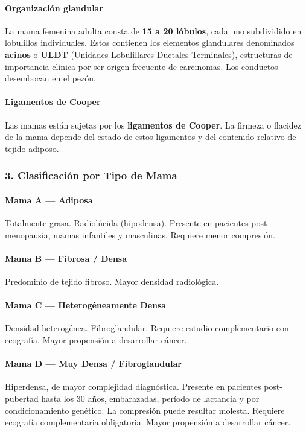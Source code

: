 	
	\paragraph{Organización glandular}
	La mama femenina adulta consta de \textbf{15 a 20 lóbulos}, cada uno subdividido en lobulillos individuales. Estos contienen los elementos glandulares denominados \textbf{acinos} o \textbf{ULDT} (Unidades Lobulillares Ductales Terminales), estructuras de importancia clínica por ser origen frecuente de carcinomas. Los conductos desembocan en el pezón.
	
	\paragraph{Ligamentos de Cooper}
	Las mamas están sujetas por los \textbf{ligamentos de Cooper}. La firmeza o flacidez de la mama depende del estado de estos ligamentos y del contenido relativo de tejido adiposo.
	
	\subsubsection*{3. Clasificación por Tipo de Mama}
	
	\paragraph{Mama A — Adiposa}
	Totalmente grasa. Radiolúcida (hipodensa). Presente en pacientes post-menopausia, mamas infantiles y masculinas. Requiere menor compresión.
	
	\paragraph{Mama B — Fibrosa / Densa}
	Predominio de tejido fibroso. Mayor densidad radiológica.
	
	\paragraph{Mama C — Heterogéneamente Densa}
	Densidad heterogénea. Fibroglandular. Requiere estudio complementario con ecografía. Mayor propensión a desarrollar cáncer.
	
	\paragraph{Mama D — Muy Densa / Fibroglandular}
	Hiperdensa, de mayor complejidad diagnóstica. Presente en pacientes post-pubertad hasta los 30 años, embarazadas, período de lactancia y por condicionamiento genético. La compresión puede resultar molesta. Requiere ecografía complementaria obligatoria. Mayor propensión a desarrollar cáncer.
	
